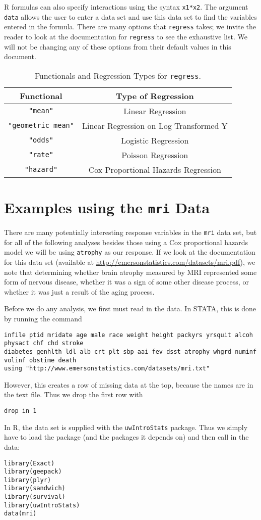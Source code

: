 \documentclass[11pt,letterpaper,fleqn]{report}
\begin{document}
R formulas can also specify interactions using the syntax \texttt{x1*x2}. The argument \texttt{data} allows the user to enter a data set and use this data set to find the variables entered in the formula. There are many options that \texttt{regress} takes; we invite the reader to look at the documentation for \texttt{regress} to see the exhaustive list. We will not be changing any of these options from their default values in this document.
\begin{table}[ht]
\centering
\begin{tabular}{cc}
Functional & Type of Regression\\
\hline
\texttt{"mean"} & Linear Regression\\
\texttt{"geometric mean"} & Linear Regression on Log Transformed Y\\
\texttt{"odds"} & Logistic Regression\\
\texttt{"rate"} & Poisson Regression\\
\texttt{"hazard"} & Cox Proportional Hazards Regression\\
\end{tabular}
\caption{Functionals and Regression Types for \texttt{regress}.}
\label{fnctl}
\end{table} 

\FloatBarrier
\section{Examples using the \texttt{mri} Data}
There are many potentially interesting response variables in the \texttt{mri} data set, but for all of the following analyses besides those using a Cox proportional hazards model we will be using \texttt{atrophy} as our response. If we look at the documentation for this data set (available at \url{http://emersonstatistics.com/datasets/mri.pdf}), we note that determining whether brain atrophy measured by MRI represented some form of nervous disease, whether it was a sign of some other disease process, or whether it was just a result of the aging process. 

Before we do any analysis, we first must read in the data. In STATA, this is done by running the command
\begin{verbatim}
infile ptid mridate age male race weight height packyrs yrsquit alcoh physact chf chd stroke 
diabetes genhlth ldl alb crt plt sbp aai fev dsst atrophy whgrd numinf volinf obstime death 
using "http://www.emersonstatistics.com/datasets/mri.txt"
\end{verbatim}
However, this creates a row of missing data at the top, because the names are in the text file. Thus we drop the first row with
\begin{verbatim}
drop in 1
\end{verbatim}
In R, the data set is supplied with the \texttt{uwIntroStats} package. Thus we simply have to load the package (and the packages it depends on) and then call in the data:
\begin{verbatim}
library(Exact)
library(geepack)
library(plyr)
library(sandwich)
library(survival)
library(uwIntroStats)
data(mri)
\end{verbatim}
\end{document}
